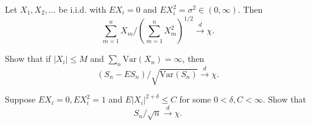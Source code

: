 \begin{exercise}
	Let $X_{1},X_{2},\ldots$ be i.i.d. with $EX_{i}=0$ and $EX_{i}^{2}=\sigma^{2}\in(0,\infty)$. Then
	\begin{equation*}
		\sum_{m=1}^{n}X_{m}/\left(\sum_{m=1}^{n}X_{m}^{2}\right)^{1/2}\stackrel{d}{\rightarrow}\chi.
	\end{equation*}
\end{exercise}

\begin{exercise}
	Show that if $\left|X_{i}\right|\leq M$ and $\sum_{n}\text{Var}\left(X_{n}\right)=\infty$, then
	\begin{equation*}
		\left(S_{n}-E S_{n}\right)/\sqrt{\text{Var}\left(S_{n}\right)}\stackrel{d}{\rightarrow}\chi.
	\end{equation*}
\end{exercise}

\begin{exercise}
	Suppose $EX_{i}=0,EX_{i}^{2}=1$ and $E\left|X_{i}\right|^{2+\delta}\leq C$ for some $0<\delta,C<\infty$. Show that
	\begin{equation*}
		S_{n}/\sqrt{n}\stackrel{d}{\rightarrow}\chi.
	\end{equation*}
\end{exercise}

